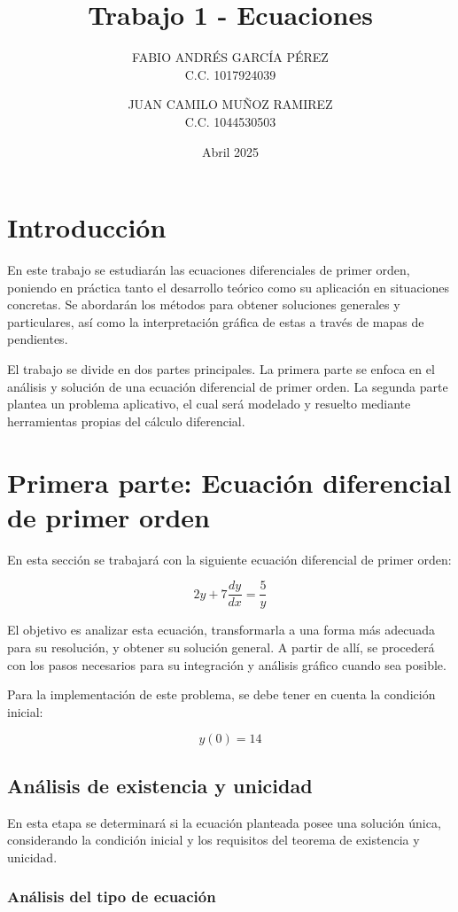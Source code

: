 \documentclass{article}
\title{Trabajo 1 - Ecuaciones}
\author{
  FABIO ANDRÉS GARCÍA PÉREZ \\
  C.C. 1017924039 \\
  \and
  JUAN CAMILO MUÑOZ RAMIREZ \\
  C.C. 1044530503
}
\date{Abril 2025}
\begin{document}
\maketitle

\section*{Introducción}

En este trabajo se estudiarán las ecuaciones diferenciales de primer orden, poniendo en práctica tanto el desarrollo teórico como su aplicación en situaciones concretas. Se abordarán los métodos para obtener soluciones generales y particulares, así como la interpretación gráfica de estas a través de mapas de pendientes.

El trabajo se divide en dos partes principales. La primera parte se enfoca en el análisis y solución de una ecuación diferencial de primer orden. La segunda parte plantea un problema aplicativo, el cual será modelado y resuelto mediante herramientas propias del cálculo diferencial.

\section{Primera parte: Ecuación diferencial de primer orden}

En esta sección se trabajará con la siguiente ecuación diferencial de primer orden:

\[
2y + 7\frac{dy}{dx} = \frac{5}{y}
\]

El objetivo es analizar esta ecuación, transformarla a una forma más adecuada para su resolución, y obtener su solución general. A partir de allí, se procederá con los pasos necesarios para su integración y análisis gráfico cuando sea posible.

Para la implementación de este problema, se debe tener en cuenta la condición inicial:

\[
y(0)= 14
\]

\subsection{Análisis de existencia y unicidad}

En esta etapa se determinará si la ecuación planteada posee una solución única, considerando la condición inicial y los requisitos del teorema de existencia y unicidad.

\subsubsection*{Análisis del tipo de ecuación}
\end{document}
